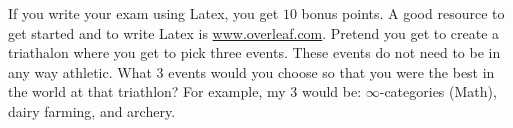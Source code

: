 \documentclass[addpoints,12pt]{exam}
\begin{document}
\begin{questions}
	\question[10] If you write your exam using Latex, you get $10$ bonus points. A good resource to get started and to write Latex is \href{www.overleaf.com}{www.overleaf.com}. 
	\question[1] Pretend you get to create a triathalon where you get to pick three events. These events do not need to be in any way athletic. What 3 events would you choose so that you were the best in the world at that triathlon? For example, my 3 would be: $\infty$-categories (Math), dairy farming, and archery. 
\end{questions}

    
\end{document}
